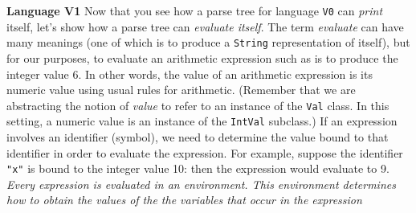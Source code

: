 \begin{minipage}[t]{\sw}
\slidenumber
\LARGE
{\bf Language V1}\exx
Now that you see how a parse tree
for language \verb'V0' can {\em print} itself,
let's show how a parse tree can {\em evaluate itself}.\exx
The term {\em evaluate} can have many meanings
(one of which is to produce a \verb'String' representation of itself),
but for our purposes,
to evaluate an arithmetic expression such
as 
is to produce the integer value 6.
In other words, the value of an arithmetic expression
is its numeric value using usual rules for arithmetic.\exx
(Remember that we are abstracting the notion of {\em value}
to refer to an instance of the \verb'Val' class.
In this setting, a numeric value is an instance
of the \verb'IntVal' subclass.)\exx
If an expression involves an identifier (symbol),
we need to determine the value bound to that identifier
in order to evaluate the expression.
For example, suppose the identifier \verb'"x"' is bound
to the integer value 10:
then the expression 
would evaluate to 9.\exx
{\em Every expression is evaluated in an environment.
This environment determines how to obtain
the values of the the variables that occur in the expression}\exx
\end{minipage}

